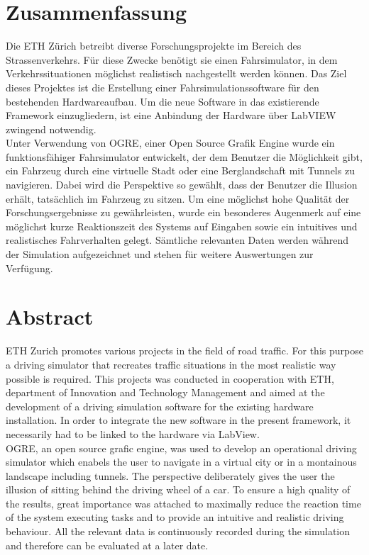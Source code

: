 \section*{Zusammenfassung}
Die ETH Zürich betreibt diverse Forschungsprojekte im Bereich des Strassenverkehrs. Für diese Zwecke benötigt sie einen Fahrsimulator, in dem Verkehrssituationen möglichst realistisch nachgestellt werden können. Das Ziel dieses Projektes ist die Erstellung einer Fahrsimulationssoftware für den bestehenden Hardwareaufbau. Um die neue Software in das existierende Framework einzugliedern, ist eine Anbindung der Hardware über LabVIEW zwingend notwendig.\\
Unter Verwendung von OGRE, einer Open Source Grafik Engine wurde ein funktionsfähiger Fahrsimulator entwickelt, der dem Benutzer die Möglichkeit gibt, ein Fahrzeug durch eine virtuelle Stadt oder eine Berglandschaft mit Tunnels zu navigieren. Dabei wird die Perspektive so gewählt, dass der Benutzer die Illusion erhält, tatsächlich im Fahrzeug zu sitzen.
Um eine möglichst hohe Qualität der Forschungsergebnisse zu gewährleisten, wurde ein besonderes Augenmerk auf eine möglichst kurze Reaktionszeit des Systems auf Eingaben sowie ein intuitives und realistisches Fahrverhalten gelegt.
Sämtliche relevanten Daten werden während der Simulation aufgezeichnet und stehen für weitere Auswertungen zur Verfügung.
\newpage
\thispagestyle{empty}
\hspace{1cm}
\newpage
\section*{Abstract}
ETH Zurich promotes various projects in the field of road traffic. For this purpose a driving simulator that recreates traffic situations in the most realistic way possible is required. This projects was conducted in cooperation with ETH, department of Innovation and Technology Management and aimed at the development of a driving simulation software for the existing hardware installation. In order to integrate the new software in the present framework, it necessarily had to be linked to the hardware via LabView. \\
OGRE, an open source grafic engine, was used to develop an operational driving simulator which enabels the user to navigate in a virtual city or in a montainous landscape including tunnels. The perspective deliberately gives the user the illusion of sitting behind the driving wheel of a car. To ensure a high quality of the results, great importance was attached to maximally reduce the reaction time of the system executing tasks and to provide an intuitive and realistic driving behaviour. All the relevant data is continuously recorded during the simulation and therefore can be evaluated at a later date.
\newpage
\thispagestyle{empty}
\hspace{1cm}
\newpage